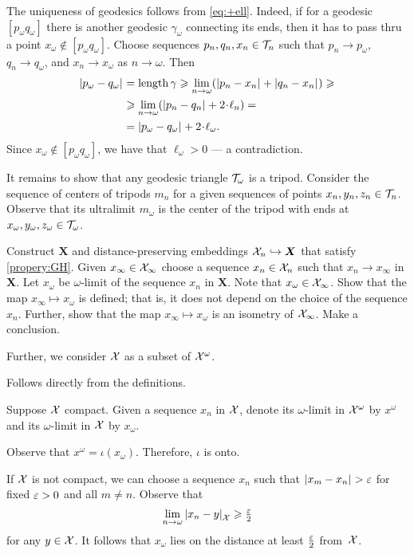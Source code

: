 The uniqueness of geodesics follows from \ref{eq:+ell}.
Indeed, if for a geodesic $[p_\omega q_\omega]$ there is another geodesic $\gamma_\omega$ connecting its ends, then it has to pass thru a point $x_\omega\notin [p_\omega q_\omega]$.
Choose sequences $p_n,q_n,x_n\in\mathcal{T}_n$ such that $p_n\to p_\omega$, $q_n\to q_\omega$, and $x_n\to x_\omega$ as $n\to\omega$.
Then 
\begin{align*}
\dist{p_\omega}{q_\omega}{}&=\length\gamma\ge \lim_{n\to\omega}(\dist{p_n}{x_n}{}+\dist{q_n}{x_n}{})\ge
\\
&\ge \lim_{n\to\omega}(\dist{p_n}{q_n}{}+2\cdot\ell_n)=
\\
&=\dist{p_\omega}{q_\omega}{}+2\cdot\ell_\omega.
\end{align*}
Since $x_\omega\notin [p_\omega q_\omega]$, we have that $\ell_\omega>0$ --- a contradiction.

It remains to show that any geodesic triangle $\mathcal{T}_\omega$ is a tripod.
Consider the sequence of centers of tripods $m_n$ for a given sequences of points $x_n,y_n,z_n\in \mathcal{T}_n$.
Observe that its ultralimit $m_\omega$ is the center of the tripod with ends at $x_\omega,y_\omega,z_\omega\in \mathcal{T}_\omega$.

Construct $\bm{X}$ and distance-preserving embeddings $\mathcal{X}_n\hookrightarrow\bm{X}$ that satisfy \ref{propery:GH}.
Given $x_\infty\in \mathcal{X}_\infty$ choose a sequence $x_n\in \mathcal{X}_n$ such that $x_n\to x_\infty$ in $\bm{X}$.
Let $x_\omega$ be $\omega$-limit of the sequence $x_n$ in $\bm{X}$.
Note that $x_\omega\in \mathcal{X}_\infty$.
Show that the map $x_\infty\mapsto x_\omega$ is defined; that is, it does not depend on the choice of the sequence $x_n$.
Further, show that the map $x_\infty\mapsto x_\omega$ is an isometry of $\mathcal{X}_\infty$.
Make a conclusion.

Further, we consider $\mathcal{X}$ as a subset of $\mathcal{X}^\omega$.

 Follows directly from the definitions.

Suppose $\mathcal{X}$ compact.
Given a sequence $x_n$ in $\mathcal{X}$, denote its $\omega$-limit in $\mathcal{X}^\omega$ by $x^\omega$ and its $\omega$-limit in $\mathcal{X}$ by $x_\omega$.

Observe that $x^\omega=\iota(x_\omega)$.
Therefore, $\iota$ is onto.

If $\mathcal{X}$ is not compact, we can choose a sequence $x_n$ such that $\dist{x_m}{x_n}{}>\eps$ for fixed $\varepsilon>0$ and all $m\ne n$.
Observe that
\[\lim_{n\to\omega}\dist{x_n}{y}{\spc{X}}\ge \tfrac\eps2\]
for any $y\in\mathcal{X}$.
It follows that $x_\omega$ lies on the distance at least $\tfrac{\varepsilon}2$ from~$\mathcal{X}$.

